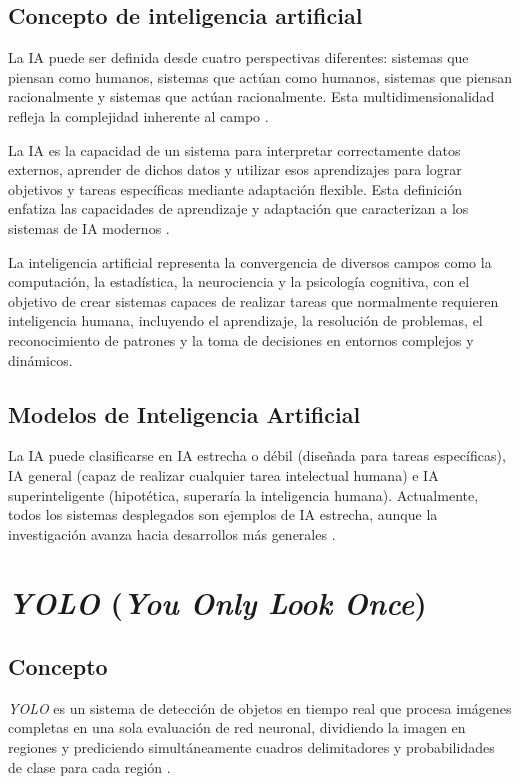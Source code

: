 \subsection{Concepto de inteligencia artificial}
La IA puede ser definida desde cuatro perspectivas diferentes: sistemas que piensan como humanos, sistemas que actúan como humanos, sistemas que piensan racionalmente y sistemas que actúan racionalmente. Esta multidimensionalidad refleja la complejidad inherente al campo \cite{russell2020}.

La IA es la capacidad de un sistema para interpretar correctamente datos externos, aprender de dichos datos y utilizar esos aprendizajes para lograr objetivos y tareas específicas mediante adaptación flexible. Esta definición enfatiza las capacidades de aprendizaje y adaptación que caracterizan a los sistemas de IA modernos \cite{kaplan2019}.

La inteligencia artificial representa la convergencia de diversos campos como la computación, la estadística, la neurociencia y la psicología cognitiva, con el objetivo de crear sistemas capaces de realizar tareas que normalmente requieren inteligencia humana, incluyendo el aprendizaje, la resolución de problemas, el reconocimiento de patrones y la toma de decisiones en entornos complejos y dinámicos.

\subsection{Modelos de Inteligencia Artificial}
La IA puede clasificarse en IA estrecha o débil (diseñada para tareas específicas), IA general (capaz de realizar cualquier tarea intelectual humana) e IA superinteligente (hipotética, superaría la inteligencia humana). Actualmente, todos los sistemas desplegados son ejemplos de IA estrecha, aunque la investigación avanza hacia desarrollos más generales \cite{bostrom2014}.

\section{\textit{YOLO} (\textit{You Only Look Once})}

\subsection{Concepto}
\textit{YOLO} es un sistema de detección de objetos en tiempo real que procesa imágenes completas en una sola evaluación de red neuronal, dividiendo la imagen en regiones y prediciendo simultáneamente cuadros delimitadores y probabilidades de clase para cada región \cite{yolo_site}.

